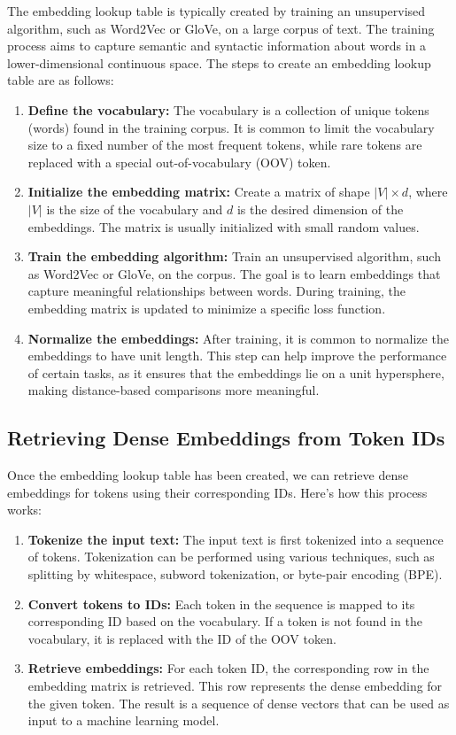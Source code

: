 \documentclass[12pt]{article}
\begin{document}
The embedding lookup table is typically created by training an unsupervised algorithm, such as Word2Vec or GloVe, on a large corpus of text. The training process aims to capture semantic and syntactic information about words in a lower-dimensional continuous space. The steps to create an embedding lookup table are as follows:

\begin{enumerate}
\item \textbf{Define the vocabulary:} The vocabulary is a collection of unique tokens (words) found in the training corpus. It is common to limit the vocabulary size to a fixed number of the most frequent tokens, while rare tokens are replaced with a special out-of-vocabulary (OOV) token.
\item \textbf{Initialize the embedding matrix:} Create a matrix of shape $|V| \times d$, where $|V|$ is the size of the vocabulary and $d$ is the desired dimension of the embeddings. The matrix is usually initialized with small random values.
\item \textbf{Train the embedding algorithm:} Train an unsupervised algorithm, such as Word2Vec or GloVe, on the corpus. The goal is to learn embeddings that capture meaningful relationships between words. During training, the embedding matrix is updated to minimize a specific loss function.
\item \textbf{Normalize the embeddings:} After training, it is common to normalize the embeddings to have unit length. This step can help improve the performance of certain tasks, as it ensures that the embeddings lie on a unit hypersphere, making distance-based comparisons more meaningful.
\end{enumerate}

\subsection{Retrieving Dense Embeddings from Token IDs}

Once the embedding lookup table has been created, we can retrieve dense embeddings for tokens using their corresponding IDs. Here's how this process works:

\begin{enumerate}
\item \textbf{Tokenize the input text:} The input text is first tokenized into a sequence of tokens. Tokenization can be performed using various techniques, such as splitting by whitespace, subword tokenization, or byte-pair encoding (BPE).
\item \textbf{Convert tokens to IDs:} Each token in the sequence is mapped to its corresponding ID based on the vocabulary. If a token is not found in the vocabulary, it is replaced with the ID of the OOV token.
\item \textbf{Retrieve embeddings:} For each token ID, the corresponding row in the embedding matrix is retrieved. This row represents the dense embedding for the given token. The result is a sequence of dense vectors that can be used as input to a machine learning model.
\end{enumerate}
\end{document}

